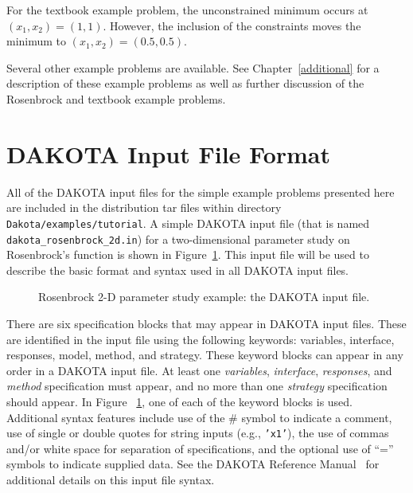 For the textbook example problem, the unconstrained minimum occurs at
$(x_1,x_2) = (1,1)$. However, the inclusion of the constraints
moves the minimum to $(x_1,x_2) = (0.5,0.5)$.

Several other example problems are available. See
Chapter~\ref{additional} for a description of these example problems
as well as further discussion of the Rosenbrock and textbook example
problems.

\section{DAKOTA Input File Format}\label{tutorial:dakota}

All of the DAKOTA input files for the simple example problems
presented here are included in the distribution tar files within
directory \texttt{Dakota/examples/tutorial}. A simple DAKOTA
input file (that is named \texttt{dakota\_rosenbrock\_2d.in})
for a two-dimensional parameter study on Rosenbrock's
function is shown in Figure~\ref{tutorial:rosenbrock_2d}.
This input file will be used to
describe the basic format and syntax used in all DAKOTA input files.

\begin{figure}[ht!]
  \centering
  \begin{bigbox}
    \begin{small}
    \end{small}
  \end{bigbox}
  \caption{Rosenbrock 2-D parameter study example: the DAKOTA input
    file.}
  \label{tutorial:rosenbrock_2d}
\end{figure}

There are six specification blocks that may appear in DAKOTA input
files. These are identified in the input file using the following
keywords: variables, interface, responses, model, method, and strategy. These
keyword blocks can appear in any order in a DAKOTA input file. At
least one \emph{variables}, \emph{interface}, \emph{responses}, and
\emph{method} specification must appear, and no more than one
\emph{strategy} specification should appear. In Figure~
\ref{tutorial:rosenbrock_2d}, one of each of the keyword blocks is
used.  Additional syntax features include use of the \#
symbol to indicate a comment, use of single or double quotes for string inputs
(e.g., \texttt{'x1'}), the use of commas and/or white space for separation of
specifications, and the optional use of ``='' symbols to indicate
supplied data. See the DAKOTA Reference
Manual~\cite{RefMan} for additional details on this input file syntax.

